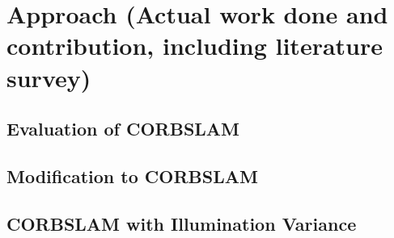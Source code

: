 
\chapter{Approach (Actual work done and contribution, including literature survey)}

\section{Evaluation of CORBSLAM}

\section{Modification to CORBSLAM}

\section{CORBSLAM with Illumination Variance}




\newpage
